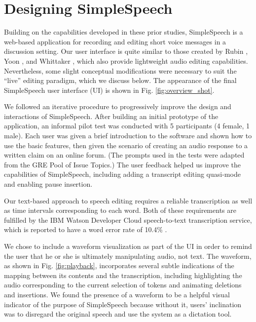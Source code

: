 \section{Designing SimpleSpeech}
Building on the capabilities developed in these prior studies, SimpleSpeech is a web-based application for recording and editing short voice messages in a discussion setting.
Our user interface is quite similar to those created by Rubin \cite{rubin}, Yoon \cite{yoon}, and Whittaker \cite{whittaker_semantic}, which also provide lightweight audio editing capabilities.
Nevertheless, some slight conceptual modifications were necessary to suit the ``live'' editing paradigm, which we discuss below.
The appearance of the final SimpleSpeech user interface (UI) is shown in Fig. \ref{fig:overview_shot}.

We followed an iterative procedure to progressively improve the design and interactions of SimpleSpeech.
After building an initial prototype of the application, an informal pilot test was conducted with 5 participants (4 female, 1 male). 
Each user was given a brief introduction to the software and shown how to use the basic features, then given the scenario of creating an audio response to a written claim on an online forum. 
(The prompts used in the tests were adapted from the GRE Pool of Issue Topics.)
The user feedback helped us improve the capabilities of SimpleSpeech, including adding a transcript editing quasi-mode and enabling pause insertion.

Our text-based approach to speech editing requires a reliable transcription as well as time intervals corresponding to each word.
Both of these requirements are fulfilled by the IBM Watson Developer Cloud speech-to-text transcription service, which is reported to have a word error rate of 10.4\% \cite{soltau:2014}.

We chose to include a waveform visualization as part of the UI in order to remind the user that he or she is ultimately manipulating audio, not text. 
The waveform, as shown in Fig. \ref{fig:playback}, incorporates several subtle indications of the mapping between its contents and the transcription, including highlighting the audio corresponding to the current selection of tokens and animating deletions and insertions.
We found the presence of a waveform to be a helpful visual indicator of the purpose of SimpleSpeech because without it, users' inclination was to disregard the original speech and use the system as a dictation tool.

